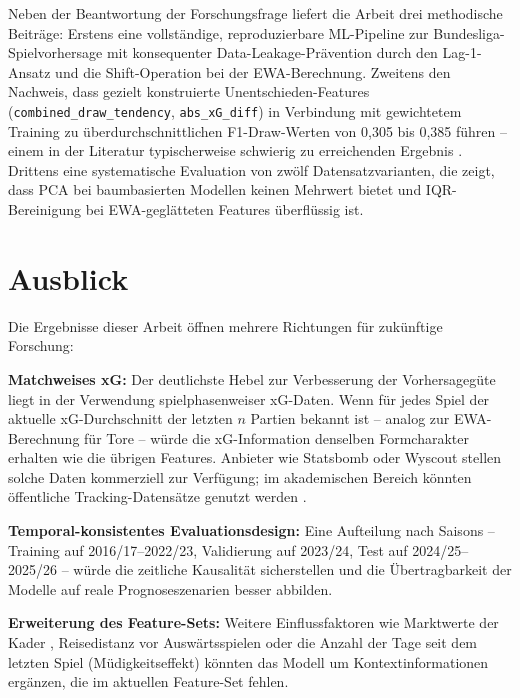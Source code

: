 Neben der Beantwortung der Forschungsfrage liefert die Arbeit drei
methodische Beiträge: Erstens eine vollständige, reproduzierbare
ML-Pipeline zur Bundesliga-Spielvorhersage mit konsequenter Data-Leakage-Prävention
durch den Lag-1-Ansatz und die Shift-Operation bei der EWA-Berechnung.
Zweitens den Nachweis, dass gezielt konstruierte Unentschieden-Features
(\texttt{combined\_draw\_tendency}, \texttt{abs\_xG\_diff}) in Verbindung
mit gewichtetem Training zu überdurchschnittlichen F1-Draw-Werten von
0,305 bis 0,385 führen -- einem in der Literatur typischerweise
schwierig zu erreichenden Ergebnis \cite{HeGarcia2009}. Drittens eine
systematische Evaluation von zwölf Datensatzvarianten, die zeigt, dass
PCA bei baumbasierten Modellen keinen Mehrwert bietet und IQR-Bereinigung
bei EWA-geglätteten Features überflüssig ist.

\section{Ausblick}
\label{sec:ausblick}

Die Ergebnisse dieser Arbeit öffnen mehrere Richtungen für zukünftige
Forschung:

\textbf{Matchweises xG:} Der deutlichste Hebel zur Verbesserung der
Vorhersagegüte liegt in der Verwendung spielphasenweiser xG-Daten.
Wenn für jedes Spiel der aktuelle xG-Durchschnitt der letzten $n$ Partien
bekannt ist -- analog zur EWA-Berechnung für Tore -- würde die xG-Information
denselben Formcharakter erhalten wie die übrigen Features. Anbieter wie
Statsbomb oder Wyscout stellen solche Daten kommerziell zur Verfügung;
im akademischen Bereich könnten öffentliche Tracking-Datensätze genutzt
werden \cite{PappalardoEtAl2019}.

\textbf{Temporal-konsistentes Evaluationsdesign:} Eine Aufteilung nach
Saisons -- Training auf 2016/17--2022/23, Validierung auf 2023/24,
Test auf 2024/25--2025/26 -- würde die zeitliche Kausalität sicherstellen
und die Übertragbarkeit der Modelle auf reale Prognoseszenarien besser
abbilden.

\textbf{Erweiterung des Feature-Sets:} Weitere Einflussfaktoren wie
Marktwerte der Kader \cite{RibeiroEtAl2025}, Reisedistanz vor Auswärtsspielen
oder die Anzahl der Tage seit dem letzten Spiel (Müdigkeitseffekt) könnten
das Modell um Kontextinformationen ergänzen, die im aktuellen Feature-Set
fehlen.

